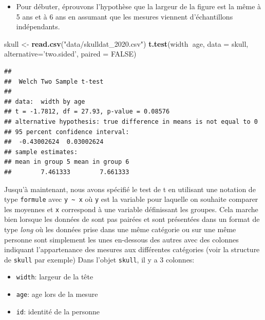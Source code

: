 \documentclass[12pt,]{book}
\newenvironment{Shaded}{\begin{snugshade}}{\end{snugshade}}
\newcommand{\DataTypeTok}[1]{\textcolor[rgb]{0.27,0.27,0.27}{#1}}
\newcommand{\KeywordTok}[1]{\textcolor[rgb]{0.27,0.27,0.27}{\textbf{#1}}}
\newcommand{\NormalTok}[1]{#1}
\newcommand{\OperatorTok}[1]{\textcolor[rgb]{0.43,0.43,0.43}{\textbf{#1}}}
\newcommand{\OtherTok}[1]{\textcolor[rgb]{0.37,0.37,0.37}{#1}}
\newcommand{\StringTok}[1]{\textcolor[rgb]{0.5,0.5,0.5}{#1}}
\providecommand{\tightlist}{%
  \setlength{\itemsep}{0pt}\setlength{\parskip}{0pt}}
\begin{document}
\begin{itemize}
\tightlist
\item
  Pour débuter, éprouvons l'hypothèse que la largeur de la figure est la même à 5 ans et à 6 ans en assumant que les mesures viennent d'échantillons indépendants.
\end{itemize}

\begin{Shaded}
\begin{Highlighting}[]
\NormalTok{skull <-}\StringTok{ }\KeywordTok{read.csv}\NormalTok{(}\StringTok{"data/skulldat_2020.csv"}\NormalTok{)}
\KeywordTok{t.test}\NormalTok{(width}\OperatorTok{~}\NormalTok{age, }\DataTypeTok{data =}\NormalTok{ skull,}
  \DataTypeTok{alternative=}\StringTok{'two.sided'}\NormalTok{,}
  \DataTypeTok{paired =} \OtherTok{FALSE}\NormalTok{)}
\end{Highlighting}
\end{Shaded}

\begin{verbatim}
## 
## 	Welch Two Sample t-test
## 
## data:  width by age
## t = -1.7812, df = 27.93, p-value = 0.08576
## alternative hypothesis: true difference in means is not equal to 0
## 95 percent confidence interval:
##  -0.43002624  0.03002624
## sample estimates:
## mean in group 5 mean in group 6 
##        7.461333        7.661333
\end{verbatim}

Jusqu'à maintenant, nous avons spécifié le test de t en utilisant une notation de type \texttt{formule} avec \texttt{y\ \textasciitilde{}\ x} où \texttt{y} est la variable pour laquelle on souhaite comparer les moyennes et \texttt{x} correspond à une variable définissant les groupes.
Cela marche bien lorsque les données de sont pas pairées et sont présentées dans un format de type \emph{long} où les données prise dans une même catégorie ou sur une même personne sont simplement les unes en-dessous des autres avec des colonnes indiquant l'appartenance des mesures aux différentes catégories (voir la structure de \texttt{skull} par exemple)
Dans l'objet \texttt{skull}, il y a 3 colonnes:

\begin{itemize}
\tightlist
\item
  \texttt{width}: largeur de la tête
\item
  \texttt{age}: age lors de la mesure
\item
  \texttt{id}: identité de la personne
\end{itemize}
\end{document}
